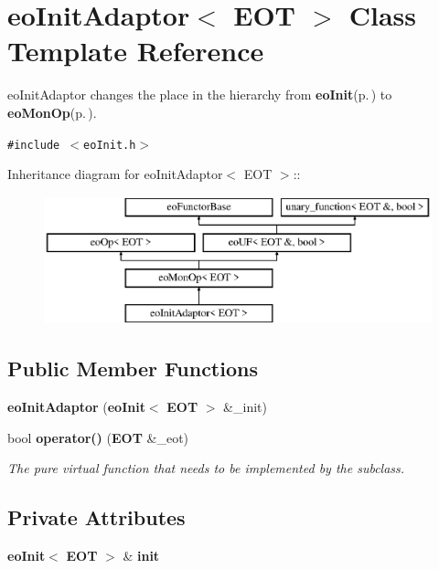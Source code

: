 \section{eo\-Init\-Adaptor$<$ EOT $>$ Class Template Reference}
\label{classeo_init_adaptor}
eo\-Init\-Adaptor changes the place in the hierarchy from {\bf eo\-Init}{\rm (p.\,\pageref{classeo_init})} to {\bf eo\-Mon\-Op}{\rm (p.\,\pageref{classeo_mon_op})}.  


{\tt \#include $<$eo\-Init.h$>$}

Inheritance diagram for eo\-Init\-Adaptor$<$ EOT $>$::\begin{figure}[H]
\begin{center}
\leavevmode
\includegraphics[height=3.71476cm]{classeo_init_adaptor}
\end{center}
\end{figure}
\subsection*{Public Member Functions}
\begin{CompactItemize}
\item 
{\bf eo\-Init\-Adaptor} ({\bf eo\-Init}$<$ {\bf EOT} $>$ \&\_\-init)\label{classeo_init_adaptor_a0}

\item 
bool {\bf operator()} ({\bf EOT} \&\_\-eot)\label{classeo_init_adaptor_a1}

\begin{CompactList}\small\item\em The pure virtual function that needs to be implemented by the subclass. \item\end{CompactList}\end{CompactItemize}
\subsection*{Private Attributes}
\begin{CompactItemize}
\item 
{\bf eo\-Init}$<$ {\bf EOT} $>$ \& {\bf init}\label{classeo_init_adaptor_r0}

\end{CompactItemize}


